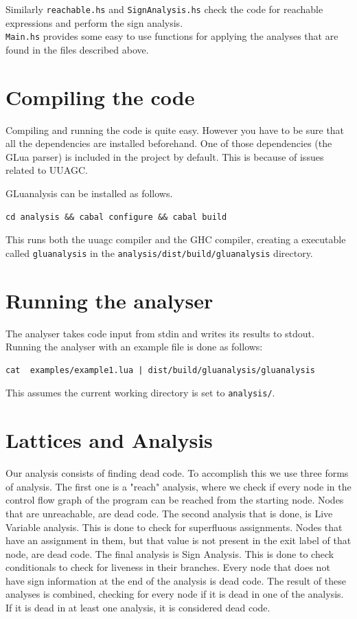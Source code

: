 \documentclass[10pt]{article}
\begin{document}
Similarly \texttt{reachable.hs} and \texttt{SignAnalysis.hs} check the code for reachable expressions and perform the sign analysis.\\
\texttt{Main.hs} provides some easy to use functions for applying the analyses that are found in the files described above.

\section{Compiling the code}

Compiling and running the code is quite easy. However you have to be sure that all the dependencies are installed beforehand. One of those dependencies (the GLua parser) is included in the project by default. This is because of issues related to UUAGC.

GLuanalysis can be installed as follows. 
\begin{lstlisting}[frame=single,numbers=none,caption=Compiling the project]
cd analysis && cabal configure && cabal build
\end{lstlisting}

This runs both the uuagc compiler and the GHC compiler, creating a executable called \texttt{gluanalysis} in the \texttt{analysis/dist/build/gluanalysis} directory.

\section{Running the analyser}
The analyser takes code input from stdin and writes its results to stdout. Running the analyser with an example file is done as follows:

\begin{lstlisting}[frame=single,numbers=none,caption=Running with an example file]
cat  examples/example1.lua | dist/build/gluanalysis/gluanalysis
\end{lstlisting}

This assumes the current working directory is set to \texttt{analysis/}.

\section{Lattices and Analysis}
Our analysis consists of finding dead code. To accomplish this we use three forms of analysis. The first one is a "reach" analysis, where we check if every node in the control flow graph of the program can be reached from the starting node. Nodes that are unreachable, are dead code.
The second analysis that is done, is Live Variable analysis. This is done to check for superfluous assignments. Nodes that have an assignment in them, but that value is not present in the exit label of that node, are dead code.
The final analysis is Sign Analysis. This is done to check conditionals to check for liveness in their branches. Every node that does not have sign information at the end of the analysis is dead code.
The result of these analyses is combined, checking for every node if it is dead in one of the analysis. If it is dead in at least one analysis, it is considered dead code.\\
\end{document}
